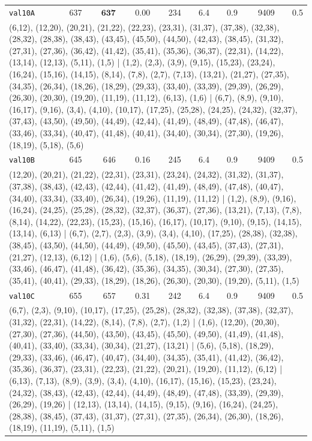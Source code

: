 \begin{longtable}{lrrrrrrrr}
\texttt{val10A} & 637 & $\mathbf{637}$ & 0.00 & 234 & 6.4 & 0.9 & 9409 & 0.5 \\
\multicolumn{9}{p{0.96\linewidth}}{\tiny\raggedright\arraybackslash (6,12), (12,20), (20,21), (21,22), (22,23), (23,31), (31,37), (37,38), (32,38), (28,32), (28,38), (38,43), (43,45), (45,50), (44,50), (42,43), (38,45), (31,32), (27,31), (27,36), (36,42), (41,42), (35,41), (35,36), (36,37), (22,31), (14,22), (13,14), (12,13), (5,11), (1,5) | (1,2), (2,3), (3,9), (9,15), (15,23), (23,24), (16,24), (15,16), (14,15), (8,14), (7,8), (2,7), (7,13), (13,21), (21,27), (27,35), (34,35), (26,34), (18,26), (18,29), (29,33), (33,40), (33,39), (29,39), (26,29), (26,30), (20,30), (19,20), (11,19), (11,12), (6,13), (1,6) | (6,7), (8,9), (9,10), (16,17), (9,16), (3,4), (4,10), (10,17), (17,25), (25,28), (24,25), (24,32), (32,37), (37,43), (43,50), (49,50), (44,49), (42,44), (41,49), (48,49), (47,48), (46,47), (33,46), (33,34), (40,47), (41,48), (40,41), (34,40), (30,34), (27,30), (19,26), (18,19), (5,18), (5,6)} \\[2pt]
\texttt{val10B} & 645 & 646 & 0.16 & 245 & 6.4 & 0.9 & 9409 & 0.5 \\
\multicolumn{9}{p{0.96\linewidth}}{\tiny\raggedright\arraybackslash (12,20), (20,21), (21,22), (22,31), (23,31), (23,24), (24,32), (31,32), (31,37), (37,38), (38,43), (42,43), (42,44), (41,42), (41,49), (48,49), (47,48), (40,47), (34,40), (33,34), (33,40), (26,34), (19,26), (11,19), (11,12) | (1,2), (8,9), (9,16), (16,24), (24,25), (25,28), (28,32), (32,37), (36,37), (27,36), (13,21), (7,13), (7,8), (8,14), (14,22), (22,23), (15,23), (15,16), (16,17), (10,17), (9,10), (9,15), (14,15), (13,14), (6,13) | (6,7), (2,7), (2,3), (3,9), (3,4), (4,10), (17,25), (28,38), (32,38), (38,45), (43,50), (44,50), (44,49), (49,50), (45,50), (43,45), (37,43), (27,31), (21,27), (12,13), (6,12) | (1,6), (5,6), (5,18), (18,19), (26,29), (29,39), (33,39), (33,46), (46,47), (41,48), (36,42), (35,36), (34,35), (30,34), (27,30), (27,35), (35,41), (40,41), (29,33), (18,29), (18,26), (26,30), (20,30), (19,20), (5,11), (1,5)} \\[2pt]
\texttt{val10C} & 655 & 657 & 0.31 & 242 & 6.4 & 0.9 & 9409 & 0.5 \\
\multicolumn{9}{p{0.96\linewidth}}{\tiny\raggedright\arraybackslash (6,7), (2,3), (9,10), (10,17), (17,25), (25,28), (28,32), (32,38), (37,38), (32,37), (31,32), (22,31), (14,22), (8,14), (7,8), (2,7), (1,2) | (1,6), (12,20), (20,30), (27,30), (27,36), (44,50), (43,50), (43,45), (45,50), (49,50), (41,49), (41,48), (40,41), (33,40), (33,34), (30,34), (21,27), (13,21) | (5,6), (5,18), (18,29), (29,33), (33,46), (46,47), (40,47), (34,40), (34,35), (35,41), (41,42), (36,42), (35,36), (36,37), (23,31), (22,23), (21,22), (20,21), (19,20), (11,12), (6,12) | (6,13), (7,13), (8,9), (3,9), (3,4), (4,10), (16,17), (15,16), (15,23), (23,24), (24,32), (38,43), (42,43), (42,44), (44,49), (48,49), (47,48), (33,39), (29,39), (26,29), (19,26) | (12,13), (13,14), (14,15), (9,15), (9,16), (16,24), (24,25), (28,38), (38,45), (37,43), (31,37), (27,31), (27,35), (26,34), (26,30), (18,26), (18,19), (11,19), (5,11), (1,5)} \\[2pt]

\end{longtable}
